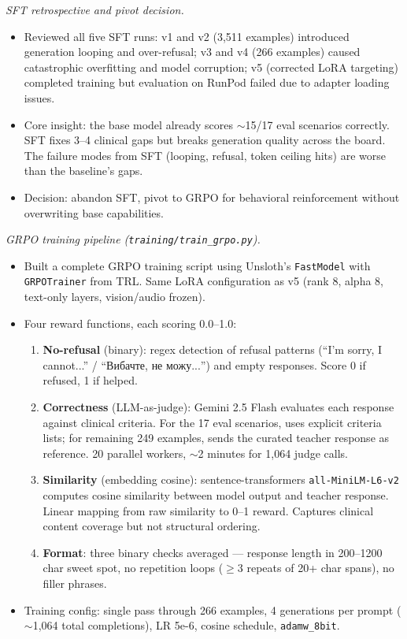 \documentclass{article}
\theoremstyle{plain}
\theoremstyle{definition}
\theoremstyle{remark}
\begin{document}
\textit{SFT retrospective and pivot decision.}
\begin{itemize}
\item Reviewed all five SFT runs: v1 and v2 (3{,}511 examples) introduced generation looping and over-refusal; v3 and v4 (266 examples) caused catastrophic overfitting and model corruption; v5 (corrected LoRA targeting) completed training but evaluation on RunPod failed due to adapter loading issues.
\item Core insight: the base model already scores $\sim$15/17 eval scenarios correctly. SFT fixes 3--4 clinical gaps but breaks generation quality across the board. The failure modes from SFT (looping, refusal, token ceiling hits) are worse than the baseline's gaps.
\item Decision: abandon SFT, pivot to GRPO for behavioral reinforcement without overwriting base capabilities.
\end{itemize}

\textit{GRPO training pipeline (\texttt{training/train\_grpo.py}).}
\begin{itemize}
\item Built a complete GRPO training script using Unsloth's \texttt{FastModel} with \texttt{GRPOTrainer} from TRL. Same LoRA configuration as v5 (rank 8, alpha 8, text-only layers, vision/audio frozen).
\item Four reward functions, each scoring 0.0--1.0:
  \begin{enumerate}
  \item \textbf{No-refusal} (binary): regex detection of refusal patterns (``I'm sorry, I cannot...'' / ``\foreignlanguage{ukrainian}{Вибачте, не можу...}'') and empty responses. Score 0 if refused, 1 if helped.
  \item \textbf{Correctness} (LLM-as-judge): Gemini 2.5 Flash evaluates each response against clinical criteria. For the 17 eval scenarios, uses explicit criteria lists; for remaining 249 examples, sends the curated teacher response as reference. 20 parallel workers, $\sim$2 minutes for 1{,}064 judge calls.
  \item \textbf{Similarity} (embedding cosine): sentence-transformers \texttt{all-MiniLM-L6-v2} computes cosine similarity between model output and teacher response. Linear mapping from raw similarity to 0--1 reward. Captures clinical content coverage but not structural ordering.
  \item \textbf{Format}: three binary checks averaged --- response length in 200--1200 char sweet spot, no repetition loops ($\geq$3 repeats of 20+ char spans), no filler phrases.
  \end{enumerate}
\item Training config: single pass through 266 examples, 4 generations per prompt ($\sim$1{,}064 total completions), LR 5e-6, cosine schedule, \texttt{adamw\_8bit}.
\end{itemize}
\end{document}
